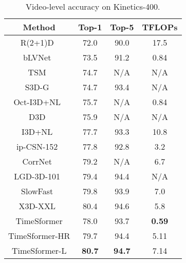 \documentclass{article}
\begin{document}
 
 \begin{table}
\footnotesize
\setlength{\tabcolsep}{3pt}
\scriptsize
\begin{center}
 \begin{tabular}{c c c c }
 \hline
{Method} & {Top-1} & {Top-5} & {TFLOPs} \\ 
 \hline
R(2+1)D~\cite{DBLP:journals/corr/abs-1711-11248} & 72.0 & 90.0 & 17.5\\
bLVNet~\cite{NEURIPS2019_3d779cae} & 73.5 & 91.2 & 0.84\\
TSM~\cite{lin2019tsm} &74.7 & N/A & N/A\\
S3D-G~\cite{DBLP:conf/eccv/XieSHTM18} & 74.7 & 93.4 & N/A \\
Oct-I3D+NL~\cite{Chen_2019_ICCV} & 75.7 & N/A & 0.84\\
D3D~\cite{Stroud_2020_WACV} & 75.9 & N/A & N/A \\
I3D+NL~\cite{NLN} & 77.7 & 93.3 & 10.8 \\
ip-CSN-152~\cite{tran2019video} & 77.8 & 92.8 & 3.2 \\ 
CorrNet~\cite{Wang_2020_CVPR} & 79.2 & N/A & 6.7 \\
LGD-3D-101~\cite{qiu2019learning} & 79.4 & 94.4 & N/A\\ 
SlowFast~\cite{slowfast} & 79.8 & 93.9 & 7.0 \\
X3D-XXL~\cite{feichtenhofer2020x3d} &80.4 & 94.6 & 5.8 \\
\hline
TimeSformer & 78.0 & 93.7 & \bf 0.59 \\
TimeSformer-HR  &  79.7 & 94.4 & 5.11 \\
TimeSformer-L &\bf 80.7 & \bf 94.7 & 7.14 \\
 \hline
 \end{tabular}
 \end{center}
\vspace{-0.3cm}
\caption{{Video-level accuracy on Kinetics-400}. \vspace{-0.1cm}}\label{k400_results_table}
 \end{table}








 
 
\end{document}
